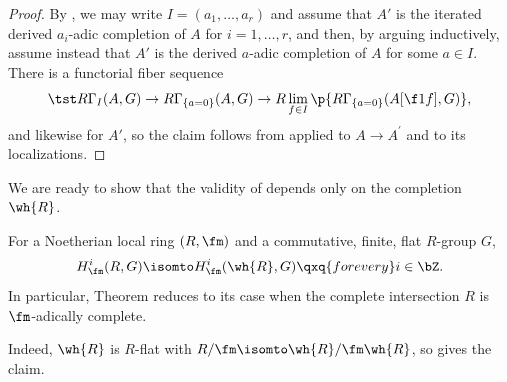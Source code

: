 \begin{proof}
By , we may write $I = (a_1, \dotsc, a_r)$ and assume that $A'$ is the iterated derived $a_i$-adic completion of $A$ for $i = 1, \dotsc, r$, %
and then, by arguing inductively, assume instead that $A'$ is the derived $a$-adic completion of $A$ for some $a \in I$.
There is a functorial fiber sequence
\[
\tst R\Gamma_I(A,G)\to R\Gamma_{\{a = 0\}}(A,G)\to R\lim_{f \in I} \p{R\Gamma_{\{a = 0\}}(A[\f 1f], G)},
\]
and likewise for $A'$, so the claim follows from  applied to $A\to A^\prime$ and to its localizations.
\end{proof}



We are ready to show that the validity of  depends only on the completion $\wh{R}$.

\bcor \label{reduce-to-complete}
For a Noetherian local ring $(R, \fm)$ and a commutative, finite, flat $R$-group $G$,
\[
H^i_\fm(R, G) \isomto H^i_{\fm}(\wh{R}, G) \qxq{for every} i \in \bZ.
\]
In particular, Theorem  reduces to its case when the complete intersection $R$ is $\fm$-adically complete.
\ecor

\bpf
Indeed, $\wh{R}$ is $R$-flat with $R/\fm \isomto \wh{R}/\fm \wh{R}$,
so  gives the claim.
\epf




